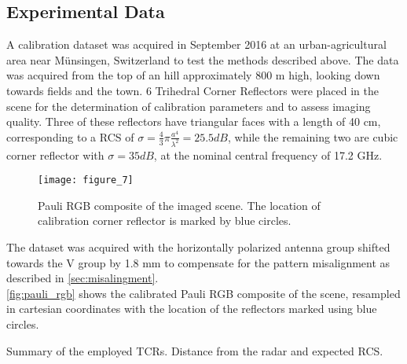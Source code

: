\subsection{Experimental Data}\label{sec:data}
A calibration dataset was acquired in September 2016 at an urban-agricultural area near M\"{u}nsingen, Switzerland to test the methods described above. The data was acquired from the top of an hill approximately 800 m high, looking down towards fields and the town. 6 Trihedral Corner Reflectors were placed in the scene for the determination of calibration parameters and to assess imaging quality. Three of these reflectors have triangular faces with a length of 40 cm, corresponding to a RCS of $\sigma=\frac{4}{3}\pi \frac{a^4}{\lambda^2}=25.5 dB$, while the remaining two are cubic corner reflector with $\sigma= 35 dB$, at the nominal central frequency of 17.2 GHz.\\
	\begin{figure}
		\centering
		\texttt{[image: figure\_7]}
		\caption{Pauli RGB composite of the imaged scene. The location of calibration corner reflector is marked by blue circles.}
		\label{fig:pauli_rgb}
	\end{figure}
The dataset was acquired with the horizontally polarized antenna group shifted towards the V group by 1.8 mm to compensate for the pattern misalignment as described in \autoref{sec:misalingment}.\\
\autoref{fig:pauli_rgb} shows the calibrated Pauli RGB composite of the scene, resampled in cartesian coordinates with the location of the reflectors marked using blue circles.

\begin{table}[ht]
	\centering
	\caption{Summary of the employed TCRs. Distance from the radar and expected RCS.}
	\label{tab:reflectors}
\end{table}



